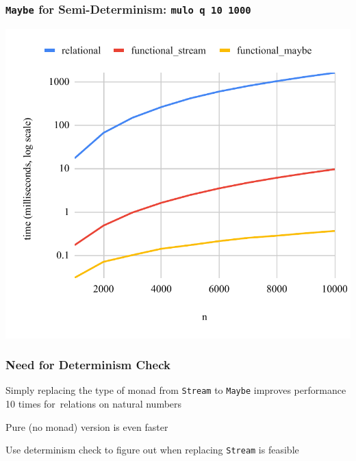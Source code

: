 \documentclass[xcolor=table, aspectratio=169]{beamer}
\begin{document}
\begin{frame}[fragile]
  \frametitle{\lstinline[basicstyle=\Large]{Maybe} for Semi-Determinism: \lstinline[basicstyle=\Large]{mulo q 10 1000}}
  \begin{center}
    \includegraphics[height=0.85\textheight]{figures/maybe.pdf}
  \end{center}
\end{frame}

\begin{frame}[fragile]
  \frametitle{Need for Determinism Check}
\begin{center}
  Simply replacing the type of monad from \texttt{Stream} to \texttt{Maybe} improves performance 10 times for~relations on natural numbers
\end{center}

\begin{center}
  Pure (no monad) version is even faster
\end{center}

\vfill

\begin{center}
  Use determinism check to figure out when replacing \texttt{Stream} is feasible
\end{center}

\end{frame}
\end{document}
